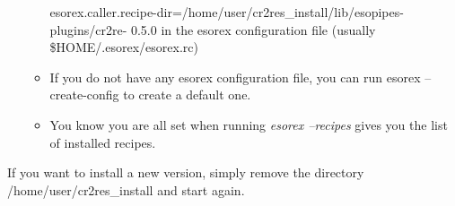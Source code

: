 \begin{itemize}
\begin{itemize}
                            esorex.caller.recipe-dir=/home/user/cr2res\_install/lib/esopipes-plugins/cr2re-
                            0.5.0
                            in the esorex configuration file (usually \$HOME/.esorex/esorex.rc)

                      \item If you do not have any esorex configuration file, you can run
                            esorex --create-config
                            to create a default one.

                      \item You know you are all set when running
                                    {\it esorex --recipes}
                            gives you the list of installed recipes.

              \end{itemize}
\end{itemize}

If you want to install a new version, simply remove the directory
/home/user/cr2res\_install and start again.



